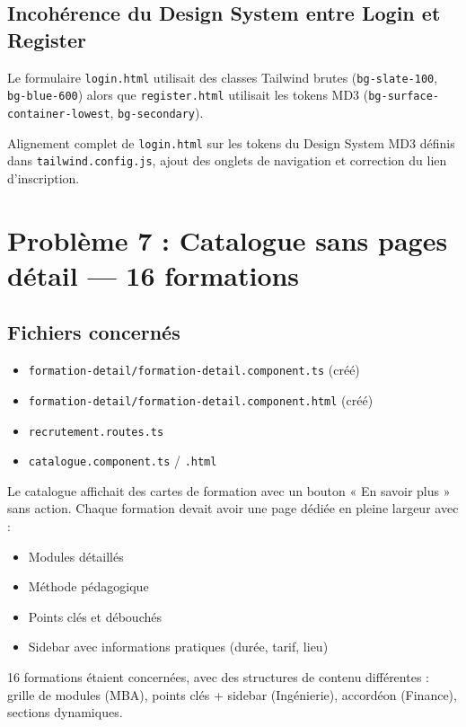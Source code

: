 \documentclass[a4paper,12pt,french]{article}
\begin{document}
\subsection{Incohérence du Design System entre Login et Register}
\begin{problembox}
Le formulaire \texttt{login.html} utilisait des classes Tailwind brutes (\texttt{bg-slate-100}, \texttt{bg-blue-600}) alors que \texttt{register.html} utilisait les tokens MD3 (\texttt{bg-surface-container-lowest}, \texttt{bg-secondary}).
\end{problembox}
\begin{solutionbox}
Alignement complet de \texttt{login.html} sur les tokens du Design System MD3 définis dans \texttt{tailwind.config.js}, ajout des onglets de navigation et correction du lien d'inscription.
\end{solutionbox}

\newpage

\section{Problème 7 : Catalogue sans pages détail — 16 formations}

\subsection{Fichiers concernés}
\begin{itemize}
    \item \texttt{formation-detail/formation-detail.component.ts} (créé)
    \item \texttt{formation-detail/formation-detail.component.html} (créé)
    \item \texttt{recrutement.routes.ts}
    \item \texttt{catalogue.component.ts} / \texttt{.html}
\end{itemize}

\begin{problembox}
Le catalogue affichait des cartes de formation avec un bouton « En savoir plus » sans action. Chaque formation devait avoir une page dédiée en pleine largeur avec :
\begin{itemize}
    \item Modules détaillés
    \item Méthode pédagogique
    \item Points clés et débouchés
    \item Sidebar avec informations pratiques (durée, tarif, lieu)
\end{itemize}

16 formations étaient concernées, avec des structures de contenu différentes : grille de modules (MBA), points clés + sidebar (Ingénierie), accordéon (Finance), sections dynamiques.
\end{problembox}
\end{document}

